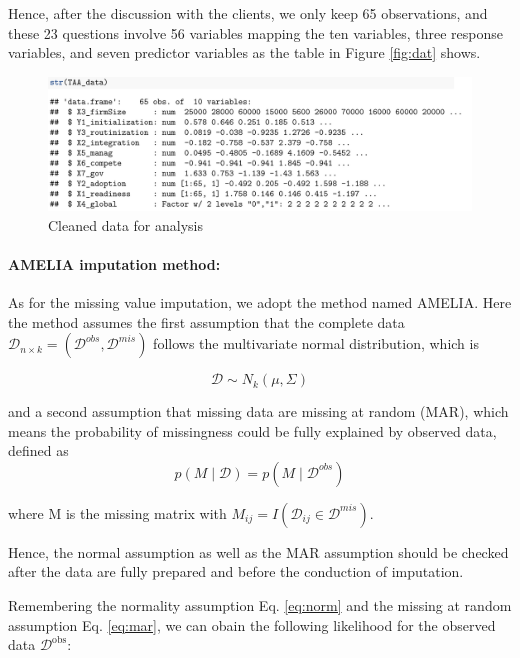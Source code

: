 \documentclass[12pt]{article}
\begin{document}
Hence, after the discussion with the clients, we only keep 65 observations, and these 23 questions involve 56 variables mapping the ten variables, three response variables, and seven predictor variables as the table in Figure \ref{fig:dat} shows.

\begin{figure}[!h]
\centering
\includegraphics[width=.8\textwidth]{data.png}
\caption{Cleaned data for analysis}
\label{fig:missmap}
\end{figure}



\paragraph{AMELIA imputation method:} As for the missing value imputation, we adopt the method named AMELIA.  \cite{honaker2011amelia}
Here the method assumes the first assumption that the complete data $\mathcal{D}_{n \times k} = ( \mathcal{D}^{obs}, \mathcal{D}^{mis})$ follows the multivariate normal distribution, which is 

\begin{equation} \label{eq:norm}
    \mathcal{D} \sim N_k (\mu, \Sigma)
\end{equation}

and a second assumption that missing data are missing at random (MAR), which means the probability of missingness could be fully explained by observed data, defined as 
\begin{equation} \label{eq:mar}
    p(M \mid \mathcal{D}) = p(M \mid \mathcal{D}^{obs})
\end{equation}

where M is the missing matrix with $M_{ij} = I(\mathcal{D}_{ij} \in \mathcal{D}^{mis})$.

Hence, the normal assumption as well as the MAR assumption should be checked after the data are fully prepared and before the conduction of imputation.

Remembering the normality assumption Eq. \ref{eq:norm} and the missing at random assumption Eq. \ref{eq:mar}, we can obain the following likelihood for the observed data $\mathcal{D}^{\mathrm{obs}}$:
\end{document}
